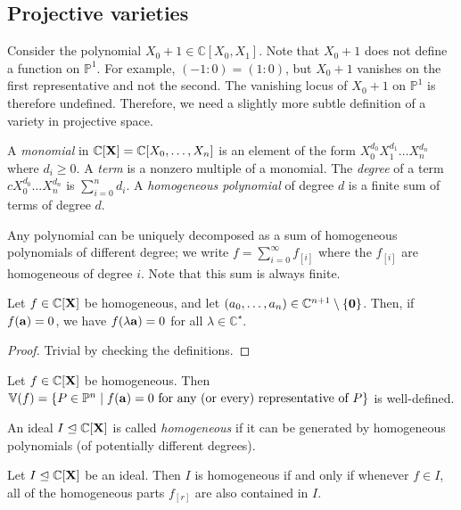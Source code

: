 \subsection{Projective varieties}
\begin{example}
    Consider the polynomial \( X_0 + 1 \in \mathbb C[X_0, X_1] \).
    Note that \( X_0 + 1 \) does not define a function on \( \mathbb P^1 \).
    For example, \( (-1 : 0) = (1 : 0) \), but \( X_0 + 1 \) vanishes on the first representative and not the second.
    The vanishing locus of \( X_0 + 1 \) on \( \mathbb P^1 \) is therefore undefined.
    Therefore, we need a slightly more subtle definition of a variety in projective space.
\end{example}
\begin{definition}
    A \emph{monomial} in \( \mathbb C[\vb X] = \mathbb C[X_0, \dots, X_n] \) is an element of the form \( X_0^{d_0} X_1^{d_1} \dots X_n^{d_n} \) where \( d_i \geq 0 \).
    A \emph{term} is a nonzero multiple of a monomial.
    The \emph{degree} of a term \( cX_0^{d_0} \dots X_n^{d_n} \) is \( \sum_{i=0}^n d_i \).
    A \emph{homogeneous polynomial} of degree \( d \) is a finite sum of terms of degree \( d \).
\end{definition}
Any polynomial can be uniquely decomposed as a sum of homogeneous polynomials of different degree; we write \( f = \sum_{i=0}^\infty f_{[i]} \) where the \( f_{[i]} \) are homogeneous of degree \( i \).
Note that this sum is always finite.
\begin{lemma}
    Let \( f \in \mathbb C[\vb X] \) be homogeneous, and let \( (a_0, \dots, a_n) \in \mathbb C^{n+1} \setminus \qty{\vb 0} \).
    Then, if \( f(\vb a) = 0 \), we have \( f(\lambda \vb a) = 0 \) for all \( \lambda \in \mathbb C^\star \).
\end{lemma}
\begin{proof}
    Trivial by checking the definitions.
\end{proof}
\begin{corollary}
    Let \( f \in \mathbb C[\vb X] \) be homogeneous.
    Then \( \mathbb V(f) = \qty{P \in \mathbb P^n \mid f(\vb a) = 0 \text{ for any (or every) representative of } P} \) is well-defined.
\end{corollary}
\begin{definition}
    An ideal \( I \trianglelefteq \mathbb C[\vb X] \) is called \emph{homogeneous} if it can be generated by homogeneous polynomials (of potentially different degrees).
\end{definition}
\begin{lemma}
    Let \( I \trianglelefteq \mathbb C[\vb X] \) be an ideal.
    Then \( I \) is homogeneous if and only if whenever \( f \in I \), all of the homogeneous parts \( f_{[r]} \) are also contained in \( I \).
\end{lemma}
